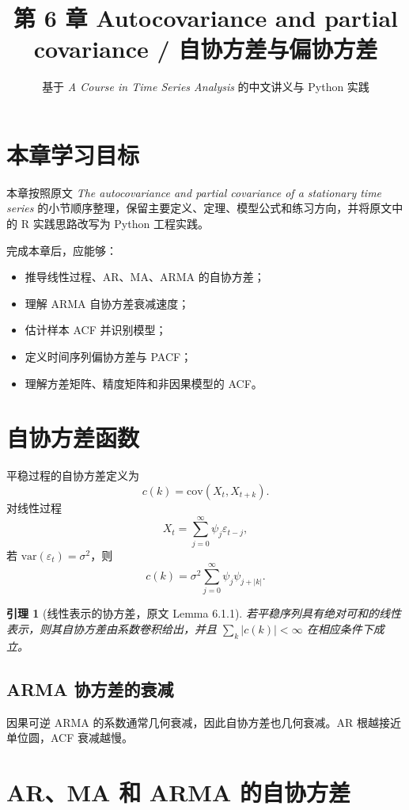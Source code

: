 \documentclass[11pt,a4paper]{ctexart}
\title{第 6 章 \quad Autocovariance and partial covariance / 自协方差与偏协方差}
\author{基于 \textit{A Course in Time Series Analysis} 的中文讲义与 Python 实践}
\date{}
\newtheorem{lemma}{引理}[section]
\begin{document}
\maketitle

\section*{本章学习目标}

本章按照原文 \textit{The autocovariance and partial covariance of a stationary time series} 的小节顺序整理，保留主要定义、定理、模型公式和练习方向，并将原文中的 R 实践思路改写为 Python 工程实践。

完成本章后，应能够：
\begin{itemize}
  \item 推导线性过程、AR、MA、ARMA 的自协方差；
  \item 理解 ARMA 自协方差衰减速度；
  \item 估计样本 ACF 并识别模型；
  \item 定义时间序列偏协方差与 PACF；
  \item 理解方差矩阵、精度矩阵和非因果模型的 ACF。
\end{itemize}

\section{自协方差函数}

平稳过程的自协方差定义为
\[
  c(k)=\mathrm{cov}(X_t,X_{t+k}).
\]
对线性过程
\[
  X_t=\sum_{j=0}^{\infty}\psi_j\varepsilon_{t-j},
\]
若 \(\mathrm{var}(\varepsilon_t)=\sigma^2\)，则
\[
  c(k)=\sigma^2\sum_{j=0}^{\infty}\psi_j\psi_{j+|k|}.
\]

\begin{lemma}[线性表示的协方差，原文 Lemma 6.1.1]
若平稳序列具有绝对可和的线性表示，则其自协方差由系数卷积给出，并且 \(\sum_k|c(k)|<\infty\) 在相应条件下成立。
\end{lemma}

\subsection{ARMA 协方差的衰减}

因果可逆 ARMA 的系数通常几何衰减，因此自协方差也几何衰减。AR 根越接近单位圆，ACF 衰减越慢。

\section{AR、MA 和 ARMA 的自协方差}
\end{document}
